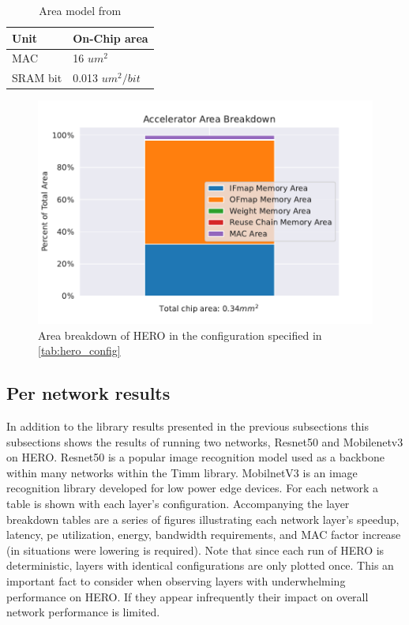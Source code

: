\begin{table}[]
    \center
    \begin{tabular}{|l|l|}
    \toprule
    Unit & On-Chip area    \\ 
    \midrule
    MAC             &  16 $um^2$ \\
    SRAM bit      &  0.013 $um^2/bit$ \\
    \bottomrule
\end{tabular}
\caption{Area model from \cite{area_model}}
\label{tab:area_model_table}
\end{table}


\begin{figure}[ht]
    \centering
    \includegraphics[scale=0.58]{Plots/resources/area.pdf}
    \caption{Area breakdown of HERO in the configuration specified in \autoref{tab:hero_config}}
    \label{fig:area_breakdown}
\end{figure}


\subsection{Per network results}
\label{chap:hero:results:network}

In addition to the library results presented in the previous subsections this
subsections shows the results of running two networks, Resnet50 and Mobilenetv3
on HERO. Resnet50 is a popular image recognition model used as a backbone within
many networks within the Timm library. MobilnetV3 is an image recognition
library developed for low power edge devices. For each network a table is shown
with each layer's configuration. Accompanying the layer breakdown tables are a
series of figures illustrating each network layer's speedup, latency, pe utilization,
energy, bandwidth requirements, and MAC factor increase (in situations were
lowering is required). Note that since each run of HERO is deterministic, layers
with identical configurations are only plotted once. This an important fact to
consider when observing layers with underwhelming performance on HERO. If they
appear infrequently their impact on overall network performance is limited. 


